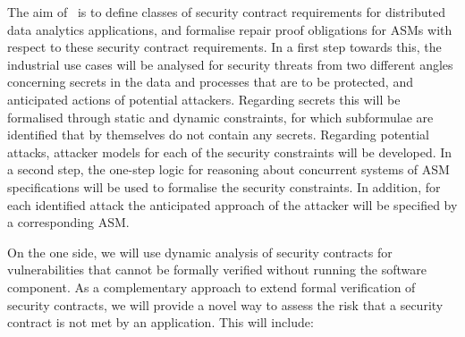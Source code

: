 \begin{Workpackage}{\thewpno}
\begin{Task}
The aim of \theTask\ is to define classes of security contract requirements for distributed data analytics applications, and formalise repair proof obligations for ASMs with respect to these security contract requirements. In a first step towards this, the industrial use cases will be analysed for security threats from two different angles concerning secrets in the data and processes that are to be protected, and anticipated actions of potential attackers. Regarding secrets this will be formalised through static and dynamic constraints, for which subformulae are identified that by themselves do not contain any secrets. Regarding potential attacks, attacker models for each of the security constraints will be developed. In a second step, the one-step logic for reasoning about concurrent systems of ASM specifications will be used to formalise the security constraints. In addition, for each identified attack the anticipated approach of the attacker will be specified by a corresponding ASM.
\end{Task}


%
%



\begin{Task}

\TaskResults{%
}
\TaskHeader{}

On the one side, we will use dynamic analysis of security contracts for
vulnerabilities that cannot be formally verified without running the software component.
As a complementary approach to extend formal verification of security contracts, %
we will provide a novel way to assess the risk that a security contract is not met by an application. This will include:


\end{Task}
\end{Workpackage}
